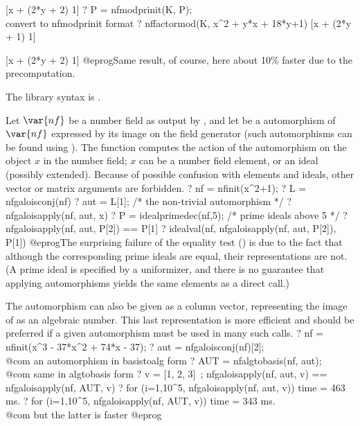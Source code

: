 [x + (2*y + 2) 1]
? P = nfmodprinit(K, P);  \\ convert to nfmodprinit format
? nffactormod(K, x^2 + y*x + 18*y+1)
[x + (2*y + 1) 1]

[x + (2*y + 2) 1]
@eprog\noindent Same result, of course, here about 10\% faster due to the
precomputation.

The library syntax is .

\label{se:nfgaloisapply}
Let $\var{nf}$ be a
number field as output by , and let  be a 
automorphism of $\var{nf}$ expressed by its image on the field generator
(such automorphisms can be found using ). The function
computes the action of the automorphism  on the object $x$ in the
number field; $x$ can be a number field element, or an ideal (possibly
extended). Because of possible confusion with elements and ideals, other
vector or matrix arguments are forbidden.
 \bprog
 ? nf = nfinit(x^2+1);
 ? L = nfgaloisconj(nf)
 ? aut = L[1]; /* the non-trivial automorphism */
 ? nfgaloisapply(nf, aut, x)
 ? P = idealprimedec(nf,5); /* prime ideals above 5 */
 ? nfgaloisapply(nf, aut, P[2]) == P[1]
 ? idealval(nf, nfgaloisapply(nf, aut, P[2]), P[1])
@eprog\noindent The surprising failure of the equality test () is
due to the fact that although the corresponding prime ideals are equal, their
representations are not. (A prime ideal is specified by a uniformizer, and
there is no guarantee that applying automorphisms yields the same elements
as a direct  call.)

The automorphism can also be given as a column vector, representing the
image of  as an algebraic number. This last
representation is more efficient and should be preferred if a given
automorphism must be used in many such calls.
\bprog
 ? nf = nfinit(x^3 - 37*x^2 + 74*x - 37);
 ? aut = nfgaloisconj(nf)[2]; \\ @com an automorphism in basistoalg form
 ? AUT = nfalgtobasis(nf, aut); \\ @com same in algtobasis form
 ? v = [1, 2, 3]~; nfgaloisapply(nf, aut, v) == nfgaloisapply(nf, AUT, v)
 ? for (i=1,10^5, nfgaloisapply(nf, aut, v))
 time = 463 ms.
 ? for (i=1,10^5, nfgaloisapply(nf, AUT, v))
 time = 343 ms.  \\ @com but the latter is faster
@eprog

